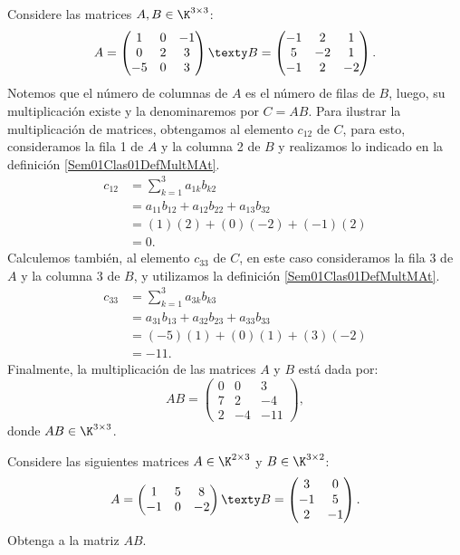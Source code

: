 \documentclass[compacto,10pt]{pubciencias-notas}
\begin{document}
\begin{ejem}
Considere las matrices $A,B\in\K^{3\times3}$:
\[ 
    A = 
    \begin{pmatrix}
    1&0&-1\\
    0&2&3\\
    -5&0&3
    \end{pmatrix}
    \texty
    B = 
    \begin{pmatrix}
    -1&2&1\\
    5&-2&1\\
    -1&2&-2
    \end{pmatrix}.
\]
Notemos que el número de columnas de $A$ es el número de filas de $B$, luego, su multiplicación existe y la denominaremos por $C = AB$. Para ilustrar la multiplicación de matrices, obtengamos al elemento $c_{12}$ de $C$, para esto, consideramos la fila 1 de $A$ y la columna 2 de $B$ y realizamos lo indicado en la definición \ref{Sem01Clas01DefMultMAt}.
\begin{align*}
    c_{12}
        &= \sum_{k=1}^{3}{a_{1k} b_{k2}}\\
        &= a_{11}b_{12} + a_{12} b_{22} + a_{13}b_{32}\\
        &= (1)(2) + (0)(- 2) + (- 1)(2)\\
        &= 0.
\end{align*}
Calculemos también, al elemento $c_{33}$ de $C$, en este caso consideramos la fila 3 de $A$ y la columna 3 de $B$, y utilizamos la definición \ref{Sem01Clas01DefMultMAt}.
\begin{align*}
    c_{33}
        &= \sum_{k=1}^{3}{a_{3k} b_{k3}}\\
        &= a_{31}b_{13} + a_{32} b_{23} + a_{33}b_{33}\\
        &= (-5)(1) + (0)(1) + (3)(-2)\\
        &= -11.
\end{align*}
Finalmente, la multiplicación de las matrices $A$ y $B$ está dada por:
\[ 
    AB = 
    \begin{pmatrix}
    0&0&3\\
    7&2&-4\\
    2&-4&-11
    \end{pmatrix},
\]
donde $AB\in\K^{3\times 3}$.
\end{ejem}

\begin{ejer}\label{Apuntes01EjerProdMat} Considere las siguientes matrices $A\in\K^{2\times 3}$ y $B\in\K^{3\times 2}$:
	\[ 
	A = 
	\begin{pmatrix}
	1  & 5 &8    \\ 
	-1  & 0 & -2  \\ 
	\end{pmatrix}
	\texty
	B = 
	\begin{pmatrix}
	3 &0 \\ 
	-1&5\\
	2&-1
	\end{pmatrix}.
	\]
	Obtenga a la matriz $AB$.
\end{ejer}
\end{document}
